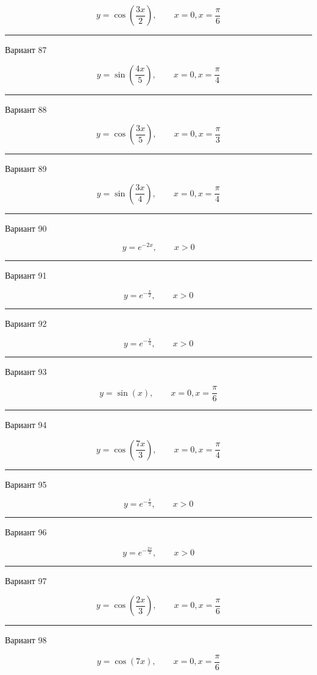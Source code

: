 \documentclass[11pt]{report}
\begin{document}
$$y=\cos{\left(\frac{3 x}{2} \right)}, \qquad x = 0, x = \frac{\pi}{6}$$

\rule{\textwidth}{.2mm}

Вариант 87

$$y=\sin{\left(\frac{4 x}{5} \right)}, \qquad x = 0, x = \frac{\pi}{4}$$

\rule{\textwidth}{.2mm}

Вариант 88

$$y=\cos{\left(\frac{3 x}{5} \right)}, \qquad x = 0, x = \frac{\pi}{3}$$

\rule{\textwidth}{.2mm}

Вариант 89

$$y=\sin{\left(\frac{3 x}{4} \right)}, \qquad x = 0, x = \frac{\pi}{4}$$

\rule{\textwidth}{.2mm}

Вариант 90

$$y=e^{- 2 x}, \qquad x > 0$$

\rule{\textwidth}{.2mm}

Вариант 91

$$y=e^{- \frac{x}{2}}, \qquad x > 0$$

\rule{\textwidth}{.2mm}

Вариант 92

$$y=e^{- \frac{x}{4}}, \qquad x > 0$$

\rule{\textwidth}{.2mm}

Вариант 93

$$y=\sin{\left(x \right)}, \qquad x = 0, x = \frac{\pi}{6}$$

\rule{\textwidth}{.2mm}

Вариант 94

$$y=\cos{\left(\frac{7 x}{3} \right)}, \qquad x = 0, x = \frac{\pi}{4}$$

\rule{\textwidth}{.2mm}

Вариант 95

$$y=e^{- \frac{x}{3}}, \qquad x > 0$$

\rule{\textwidth}{.2mm}

Вариант 96

$$y=e^{- \frac{2 x}{3}}, \qquad x > 0$$

\rule{\textwidth}{.2mm}

Вариант 97

$$y=\cos{\left(\frac{2 x}{3} \right)}, \qquad x = 0, x = \frac{\pi}{6}$$

\rule{\textwidth}{.2mm}

Вариант 98

$$y=\cos{\left(7 x \right)}, \qquad x = 0, x = \frac{\pi}{6}$$
\end{document}
